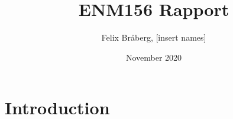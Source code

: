 \documentclass{article}
\title{ENM156 Rapport}
\author{Felix Bråberg, [insert names]}
\date{November 2020}
\begin{document}
\maketitle

\section{Introduction}
\end{document}
